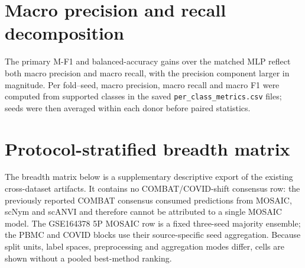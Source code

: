 \documentclass[10pt]{article}
\begin{document}
\section{Macro precision and recall decomposition}

The primary M-F1 and balanced-accuracy gains over the matched MLP reflect both macro precision and macro recall, with the precision component larger in magnitude. Per fold--seed, macro precision, macro recall and macro F1 were computed from supported classes in the saved \texttt{per\_class\_metrics.csv} files; seeds were then averaged within each donor before paired statistics.

\begin{table}[H]
\centering
\caption{Support-aware macro precision, recall and F1 decomposition for MOSAIC full versus the matched MLP protocol. Differences are MOSAIC minus MLP after averaging seeds within each held-out donor. Macro recall is the support-aware balanced-accuracy calculation. The primary M-F1 in Table~\ref{tab:donor-full} is the run-level aggregate, whereas this table recomputes macro F1 from supported per-class files before donor pairing; the small numerical difference is therefore an aggregation/zero-support convention difference, not a second primary endpoint. Relative to the primary run-level M-F1, the support-aware macro-F1 differs by +0.0018 for MOSAIC and +0.0017 for the MLP.}
\label{tab:macro-pr}
\small
\resizebox{\textwidth}{!}{%

}
\end{table}

\section{Protocol-stratified breadth matrix}

The breadth matrix below is a supplementary descriptive export of the existing cross-dataset artifacts. It contains no COMBAT/COVID-shift consensus row: the previously reported COMBAT consensus consumed predictions from MOSAIC, scNym and scANVI and therefore cannot be attributed to a single MOSAIC model. The GSE164378 5P MOSAIC row is a fixed three-seed majority ensemble; the PBMC and COVID blocks use their source-specific seed aggregation. Because split units, label spaces, preprocessing and aggregation modes differ, cells are shown without a pooled best-method ranking.
\end{document}
